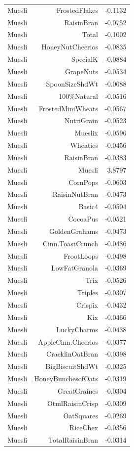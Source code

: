 \begin{longtable}{@{}lrr@{}}
Muesli & FrostedFlakes & -0.1132 \\
Muesli & RaisinBran & -0.0752 \\
Muesli & Total & -0.1002 \\
Muesli & HoneyNutCheerios & -0.0835 \\
Muesli & SpecialK & -0.0884 \\
Muesli & GrapeNuts & -0.0534 \\
Muesli & SpoonSizeShdWt & -0.0688 \\
Muesli & 100\%Natural & -0.0516 \\
Muesli & FrostedMiniWheats & -0.0567 \\
Muesli & NutriGrain & -0.0523 \\
Muesli & Mueslix & -0.0596 \\
Muesli & Wheaties & -0.0456 \\
Muesli & RaisinBran & -0.0383 \\
Muesli & Muesli & 3.8797 \\
Muesli & CornPops & -0.0603 \\
Muesli & RaisinNutBran & -0.0473 \\
Muesli & Basic4 & -0.0504 \\
Muesli & CocoaPus & -0.0521 \\
Muesli & GoldenGrahams & -0.0473 \\
Muesli & Cinn.ToastCrunch & -0.0486 \\
Muesli & FrootLoops & -0.0498 \\
Muesli & LowFatGranola & -0.0369 \\
Muesli & Trix & -0.0526 \\
Muesli & Triples & -0.0307 \\
Muesli & Crispix & -0.0432 \\
Muesli & Kix & -0.0466 \\
Muesli & LuckyCharms & -0.0438 \\
Muesli & AppleCinn.Cheerios & -0.0377 \\
Muesli & CracklinOatBran & -0.0398 \\
Muesli & BigBiscuitShdWt & -0.0325 \\
Muesli & HoneyBunchesofOats & -0.0319 \\
Muesli & GreatGraines & -0.0304 \\
Muesli & OtmlRaisinCrisp & -0.0309 \\
Muesli & OatSquares & -0.0269 \\
Muesli & RiceChex & -0.0356 \\
Muesli & TotalRaisinBran & -0.0314 \\

\end{longtable}
